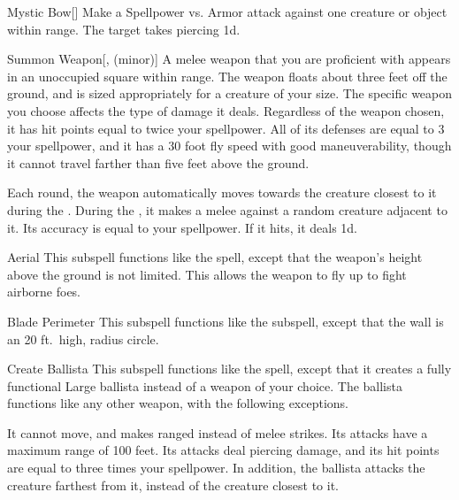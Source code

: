 \begin{ability}[\nth{1}]{Mystic Bow}[]
Make a Spellpower vs. Armor attack against one creature or object within \rngmed range.
\hit The target takes piercing  \plus1d.
\end{ability}
\vspace{0.25em}


\begin{ability}[\nth{1}]{Summon Weapon}[,  (minor)]
A melee weapon that you are proficient with appears in an unoccupied square within \rngmed range.
The weapon floats about three feet off the ground, and is sized appropriately for a creature of your size.
The specific weapon you choose affects the type of damage it deals.
Regardless of the weapon chosen, it has hit points equal to twice your spellpower.
All of its defenses are equal to 3 \add your spellpower, and it has a 30 foot fly speed with good maneuverability, though it cannot travel farther than five feet above the ground.

Each round, the weapon automatically moves towards the creature closest to it during the .
During the , it makes a melee  against a random creature adjacent to it.
Its accuracy is equal to your spellpower.
If it hits, it deals  \minus1d.
\end{ability}
\vspace{0.25em}


\begin{ability}[\nth{2}]{Aerial}
This subspell functions like the  spell, except that the weapon's height above the ground is not limited.
This allows the weapon to fly up to fight airborne foes.
\end{ability}
\vspace{0.25em}


\begin{ability}[\nth{3}]{Blade Perimeter}
This subspell functions like the  subspell, except that the wall is an 20 ft.\ high, \areamed radius circle.
\end{ability}
\vspace{0.25em}


\begin{ability}[\nth{3}]{Create Ballista}
This subspell functions like the  spell, except that it creates a fully functional Large ballista instead of a weapon of your choice.
The ballista functions like any other weapon, with the following exceptions.

It cannot move, and makes ranged  instead of melee strikes.
Its attacks have a maximum range of 100 feet.
Its attacks deal piercing damage, and its hit points are equal to three times your spellpower.
In addition, the ballista attacks the creature farthest from it, instead of the creature closest to it.
\end{ability}
\vspace{0.25em}


